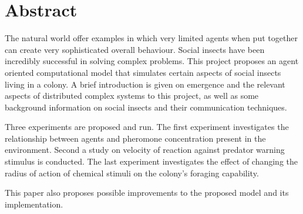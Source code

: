 

\begingroup
\let\clearpage\relax
\let\cleardoublepage\relax
\let\cleardoublepage\relax

\chapter*{Abstract} %

The natural world offer examples in which very limited agents when put together can create very sophisticated overall behaviour. Social insects have been incredibly successful in solving complex problems. This project proposes an agent oriented computational model that simulates certain aspects of social insects living in a colony. A brief introduction is given on emergence and the relevant aspects of distributed complex systems to this project, as well as some background information on social insects and their communication techniques.

Three experiments are proposed and run. The first experiment investigates the relationship between agents and pheromone concentration present in the environment. Second a study on velocity of reaction against predator warning stimulus is conducted. The last experiment investigates the effect of changing the radius of action of chemical stimuli on the colony's foraging capability.

This paper also proposes possible improvements to the proposed model and its implementation. 

\endgroup

\vfill